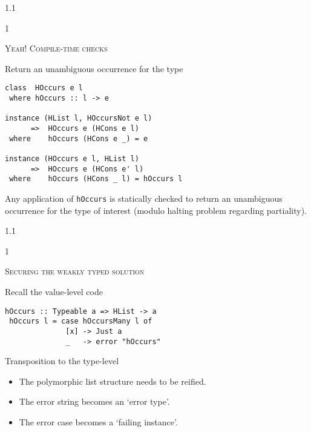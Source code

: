 \documentclass{slides}
\newcommand{\noskip}{\topsep0pt \parskip0pt \partopsep0pt}
\newcommand{\header}[1]{{\large\scshape \color{Red} #1} \medskip }
\newcommand{\blau}[1]{{\color{Blue} #1} \medskip }
\newenvironment{myslide}{\begin{slide}\color{Blue}\begin{boxedminipage}{1.1\hsize}\begin{boxedminipage}{1\hsize}\color{Black}
\vspace{-170\in}
}{%
\smallskip
\end{boxedminipage}
\end{boxedminipage}
\end{slide}}
\begin{document}
\begin{myslide}

\header{Yeah! Compile-time checks}

\blau{Return an unambiguous occurrence for the type}

\begin{Verbatim}[fontseries=normal,fontsize=\tiny]
class  HOccurs e l
 where hOccurs :: l -> e

instance (HList l, HOccursNot e l)
      =>  HOccurs e (HCons e l)
 where    hOccurs (HCons e _) = e

instance (HOccurs e l, HList l)
      =>  HOccurs e (HCons e' l)
 where    hOccurs (HCons _ l) = hOccurs l
\end{Verbatim}

\medskip

{\small

Any application of \texttt{hOccurs} is statically checked to return an
unambiguous occurrence for the type of interest (modulo halting
problem regarding partiality).

}

\end{myslide}






\begin{myslide}

\header{Securing the weakly typed solution}

\blau{Recall the value-level code}

\begin{Verbatim}[fontseries=normal,fontsize=\small]
 hOccurs :: Typeable a => HList -> a
 hOccurs l = case hOccursMany l of
              [x] -> Just a
              _   -> error "hOccurs"
\end{Verbatim}

\medskip

\blau{Transposition to the type-level}

{\small

\noskip\begin{itemize}
\item The polymorphic list structure needs to be reified.
\item The error string becomes an `error type'.
\item The error case becomes a `failing instance'.
\end{itemize}

}

\end{myslide}
\end{document}
